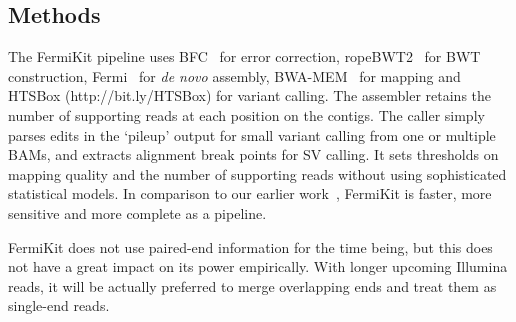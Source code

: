 \documentclass{bioinfo}
\begin{document}
\begin{methods}
\section{Methods}
The FermiKit pipeline uses BFC~\citep{Li:2015aa-tmp} for error correction,
ropeBWT2~\citep{Li:2014ab} for BWT construction,
Fermi~\citep{Li:2012fk} for {\it de novo} assembly, BWA-MEM~\citep{Li:2013aa}
for mapping and HTSBox (http://bit.ly/HTSBox) for variant calling.
The assembler retains the number of supporting reads at each position on the
contigs. The caller simply parses edits in the `pileup' output for small
variant calling from one or multiple BAMs, and extracts alignment break points
for SV calling. It sets thresholds on mapping quality and the number of
supporting reads without using sophisticated statistical models.
In comparison to our earlier work~\citep{Li:2012fk}, FermiKit is faster, more
sensitive and more complete as a pipeline.

FermiKit does not use paired-end information for the time being, but this does
not have a great impact on its power empirically. With longer upcoming Illumina
reads, it will be actually preferred to merge overlapping ends and treat them
as single-end reads.

\end{methods}
\end{document}
